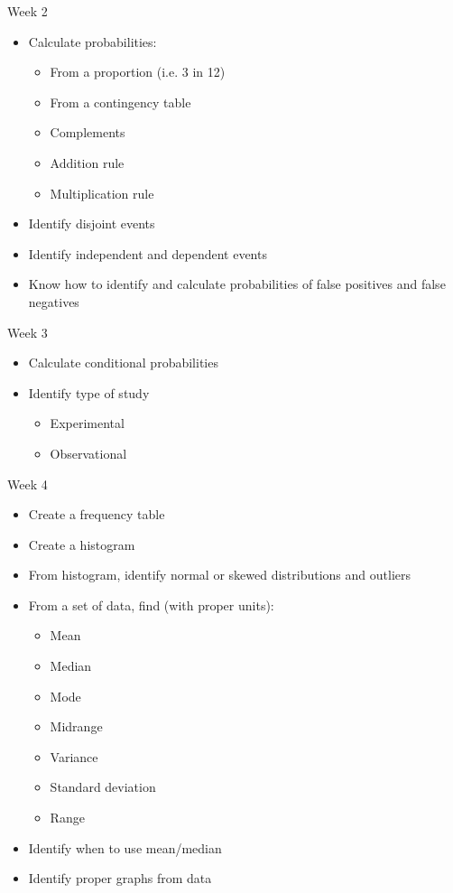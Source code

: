\documentclass[xcolor=table, aspectratio=169, bigger]{beamer}
\begin{document}
\begin{frame}{Week 2}
\begin{block}{}
\begin{itemize}
\item Calculate probabilities:
\begin{itemize}
\item From a proportion (i.e. 3 in 12)
\item From a contingency table
\item Complements
\item Addition rule
\item Multiplication rule
\end{itemize}
\item Identify disjoint events
\item Identify independent and dependent events
\item Know how to identify and calculate probabilities of false positives and false negatives
\end{itemize}
\end{block}
\end{frame}

\begin{frame}{Week 3}
\begin{block}{}
\begin{itemize}
\item Calculate conditional probabilities
\item Identify type of study
\begin{itemize}
\item Experimental
\item Observational
\end{itemize}
\end{itemize}
\end{block}
\end{frame}



\begin{frame}{Week 4}
\begin{block}{}
\begin{itemize}
\item Create a frequency table
\item Create a histogram
\item From histogram, identify normal or skewed distributions and outliers
\item From a set of data, find (with proper units):
\begin{itemize}
\item Mean
\item Median
\item Mode
\item Midrange
\item Variance
\item Standard deviation
\item Range
\end{itemize}
\item Identify when to use mean/median
\item Identify proper graphs from data
\end{itemize}
\end{block}
\end{frame}
\end{document}
